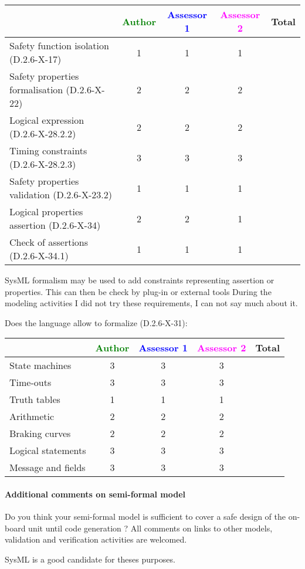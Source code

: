 \begin{tabular}{|l | c | c | c | c|}
\hline
& \textcolor{green}{Author} & \textcolor{blue}{Assessor 1} & \textcolor{magenta}{Assessor 2} & Total \\
\hline 
Safety function isolation (D.2.6-X-17)  & 1& 1& 1 &  \\
\hline 
Safety properties formalisation (D.2.6-X-22)  &2 & 2& 2  &  \\
\hline
Logical expression (D.2.6-X-28.2.2)  &2 & 2& 2&  \\
\hline
Timing constraints (D.2.6-X-28.2.3)  &3 & 3 & 3&  \\
\hline
Safety properties validation (D.2.6-X-23.2)  &1 & 1& 1&  \\
\hline
Logical properties assertion (D.2.6-X-34)  &2 & 2& 1 &  \\
\hline
Check  of assertions (D.2.6-X-34.1)  &1 & 1& 1 &  \\
\hline
\end{tabular}
\begin{author_comment}
SysML formalism may be used to add constraints representing assertion
or properties. This can then be check by plug-in or external tools
During the modeling activities I did not try these requirements, I can
not say much about it.
\end{author_comment}
Does the language allow to  formalize (D.2.6-X-31):

\begin{tabular}{|l | c | c | c | c|}
\hline
& \textcolor{green}{Author} & \textcolor{blue}{Assessor 1} & \textcolor{magenta}{Assessor 2} & Total \\
\hline 
State machines  &3 & 3& 3&  \\
\hline
Time-outs  &3 & 3& 3&  \\
\hline
Truth tables  &1 &1 & 1&  \\
\hline
Arithmetic  &2 & 2& 2&  \\
\hline
Braking curves  &2 & 2& 2&  \\
\hline
Logical statements &3 & 3& 3&  \\
\hline
Message and fields &3 & 3&3 &  \\
\hline
\end{tabular}

\paragraph{Additional comments on semi-formal  model} Do you think your semi-formal  model is sufficient to cover a safe design of the on-board unit until code generation ?
All comments on links to  other models, validation and verification activities are welcomed.
\begin{author_comment}
SysML \cite{sysmlbook} is a good candidate for theses purposes.
\end{author_comment}
